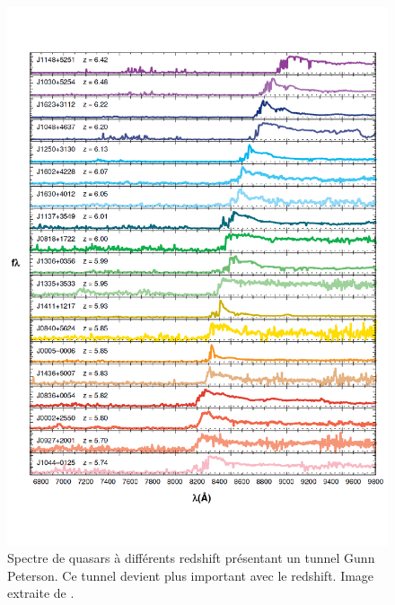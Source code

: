 
\begin{figure}
        \includegraphics[width=.95\linewidth]{img/01/quasar_spectre.pdf} 
        \caption[Spectre de quasars]{Spectre de quasars à différents redshift présentant un tunnel Gunn Peterson.
        Ce tunnel devient plus important avec le redshift.
		Image extraite de \cite{fan_constraining_2006}.
 		\label{fig:spectre_quasar}}
\end{figure}



